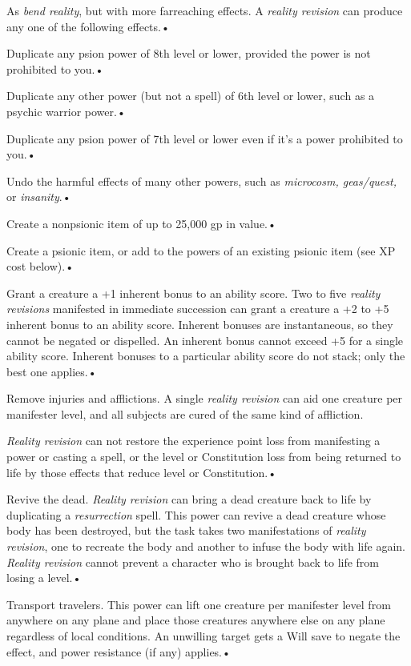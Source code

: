 \documentclass{article}
\begin{document}
As \textit{bend reality}, but with more farreaching effects. A \textit{reality 
revision }can produce any one of the following effects.• 

\parindent=3pt
Duplicate any psion power of 8th level or lower, provided the power is not prohibited 
to you.• 

Duplicate any other power (but not a spell) of 6th level or lower, such as a psychic 
warrior power.• 

\parindent=7pt
Duplicate any psion power of 7th level or lower even if it's a power prohibited 
to you.• 

\parindent=3pt
Undo the harmful effects of many other powers, such as \textit{microcosm, geas/quest, 
}or \textit{insanity}.• 

Create a nonpsionic item of up to 25,000 gp in value.• 

\parindent=7pt
Create a psionic item, or add to the powers of an existing psionic item (see XP 
cost below).• 

\parindent=3pt
Grant a creature a +1 inherent bonus to an ability score. Two to five \textit{reality 
revisions }manifested in immediate succession can grant a creature a +2 to +5 inherent 
bonus to an ability score. Inherent bonuses are instantaneous, so they cannot be 
negated or dispelled. An inherent bonus cannot exceed +5 for a single ability score. 
Inherent bonuses to a particular ability score do not stack; only the best one 
applies.• 

Remove injuries and afflictions. A single \textit{reality revision }can aid one 
creature per manifester level, and all subjects are cured of the same kind of affliction. 

\parindent=0pt
\textit{Reality revision }can not restore the experience point loss from manifesting 
a power or casting a spell, or the level or  Constitution loss from being returned 
to life by those effects that reduce level or Constitution.• 

\parindent=3pt
Revive the dead. \textit{Reality revision }can bring a dead creature back to life 
by duplicating a \textit{resurrection }spell. This power can revive a dead creature 
whose body has been destroyed, but the task takes two manifestations of \textit{reality 
revision}, one to recreate the body and another to infuse the body with life again. 
\textit{Reality revision }cannot prevent a character who is brought back to life 
from losing a level.• 

Transport travelers. This power can lift one creature per manifester level from 
anywhere on any plane and place those creatures anywhere else on any plane regardless 
of local conditions. An unwilling target gets a Will save to negate the effect, 
and power resistance (if any) applies.• 
\end{document}
